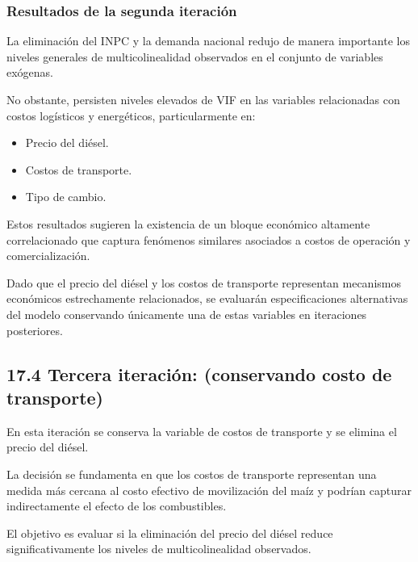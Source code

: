 \documentclass[11pt]{article}
\providecommand{\tightlist}{%
      \setlength{\itemsep}{0pt}\setlength{\parskip}{0pt}}
\begin{document}
    \hypertarget{resultados-de-la-segunda-iteraciuxf3n}{%
\subsubsection{Resultados de la segunda
iteración}\label{resultados-de-la-segunda-iteraciuxf3n}}

La eliminación del INPC y la demanda nacional redujo de manera
importante los niveles generales de multicolinealidad observados en el
conjunto de variables exógenas.

No obstante, persisten niveles elevados de VIF en las variables
relacionadas con costos logísticos y energéticos, particularmente en:

\begin{itemize}
\tightlist
\item
  Precio del diésel.
\item
  Costos de transporte.
\item
  Tipo de cambio.
\end{itemize}

Estos resultados sugieren la existencia de un bloque económico altamente
correlacionado que captura fenómenos similares asociados a costos de
operación y comercialización.

Dado que el precio del diésel y los costos de transporte representan
mecanismos económicos estrechamente relacionados, se evaluarán
especificaciones alternativas del modelo conservando únicamente una de
estas variables en iteraciones posteriores.

    \hypertarget{tercera-iteraciuxf3n-conservando-costo-de-transporte}{%
\subsection{17.4 Tercera iteración: (conservando costo de
transporte)}\label{tercera-iteraciuxf3n-conservando-costo-de-transporte}}

En esta iteración se conserva la variable de costos de transporte y se
elimina el precio del diésel.

La decisión se fundamenta en que los costos de transporte representan
una medida más cercana al costo efectivo de movilización del maíz y
podrían capturar indirectamente el efecto de los combustibles.

El objetivo es evaluar si la eliminación del precio del diésel reduce
significativamente los niveles de multicolinealidad observados.
\end{document}
